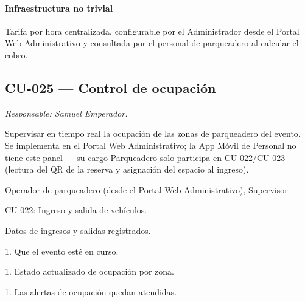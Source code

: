 \paragraph{Infraestructura no trivial}
Tarifa por hora centralizada, configurable por el Administrador desde el Portal Web Administrativo y consultada por el personal de parqueadero al calcular el cobro.

\subsection{CU-025 --- Control de ocupación}
\label{cu:cu-025}
\textit{Responsable: Samuel Emperador.}

\begin{description}[leftmargin=!, labelwidth=3.4cm, style=nextline, topsep=3pt]
\item[Objetivo] Supervisar en tiempo real la ocupación de las zonas de parqueadero del evento. Se implementa en el Portal Web Administrativo; la App Móvil de Personal no tiene este panel — su cargo Parqueadero solo participa en CU-022/CU-023 (lectura del QR de la reserva y asignación del espacio al ingreso).

\item[Actores] Operador de parqueadero (desde el Portal Web Administrativo), Supervisor

\item[CU relacionados] CU-022: Ingreso y salida de vehículos.

\item[Entradas] Datos de ingresos y salidas registrados.

\item[Pre-condiciones] 1. Que el evento esté en curso.

\item[Salidas] 1. Estado actualizado de ocupación por zona.

\item[Post-condiciones] 1. Las alertas de ocupación quedan atendidas.

\end{description}

